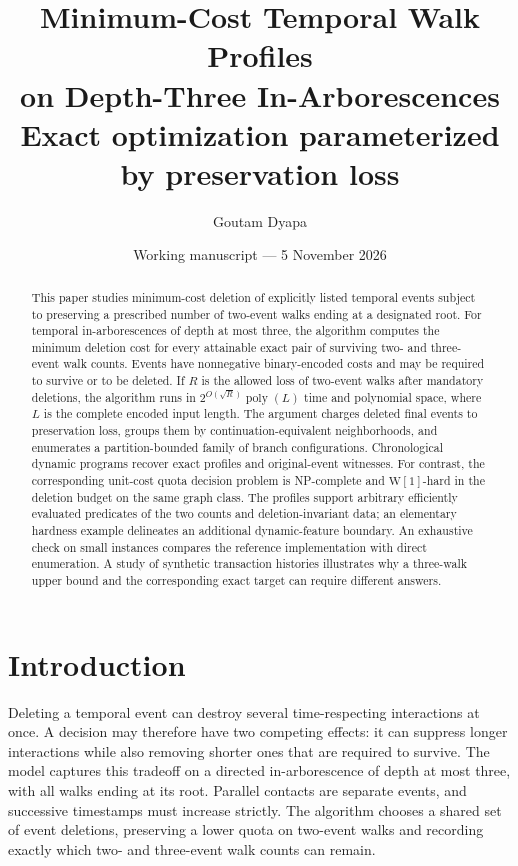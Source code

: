 \documentclass[11pt]{article}
\title{Minimum-Cost Temporal Walk Profiles\\[0.15em]
on Depth-Three In-Arborescences\\[0.4em]
\large Exact optimization parameterized by preservation loss}
\author{Goutam Dyapa}
\date{Working manuscript --- 5 November 2026}
\theoremstyle{remark}
\newcommand{\poly}{\operatorname{poly}}
\begin{document}
\maketitle
\begin{abstract}
This paper studies minimum-cost deletion of explicitly listed temporal events subject to
preserving a prescribed number of two-event walks ending at a designated root.
For temporal in-arborescences of depth at most three, the algorithm computes the minimum
deletion cost for every attainable exact pair of surviving two- and three-event
walk counts. Events have nonnegative binary-encoded costs and may be required
to survive or to be deleted. If $R$ is the allowed loss of two-event walks after
mandatory deletions, the algorithm runs in $2^{O(\sqrt R)}\poly(L)$ time and
polynomial space, where $L$ is the complete encoded input length. The argument
charges deleted final events to preservation loss, groups them by
continuation-equivalent neighborhoods, and enumerates a partition-bounded
family of branch configurations. Chronological dynamic programs recover exact
profiles and original-event witnesses. For contrast, the corresponding
unit-cost quota decision problem is NP-complete and $\mathrm{W}[1]$-hard in
the deletion budget on the same graph class. The profiles support arbitrary
efficiently evaluated predicates of the two counts and deletion-invariant
data; an elementary hardness example delineates an additional dynamic-feature
boundary. An exhaustive check on small instances compares the reference
implementation with direct enumeration. A study of synthetic
transaction histories illustrates why a three-walk upper bound and the
corresponding exact target can require different answers.
\end{abstract}

\section{Introduction}\label{sec:intro}

Deleting a temporal event can destroy several time-respecting interactions
at once. A decision may therefore have two competing effects: it can suppress
longer interactions while also removing shorter ones that are required to
survive. The model captures this tradeoff on a directed in-arborescence of depth at most three, with all walks
ending at its root. Parallel contacts are separate events, and successive
timestamps must increase strictly. The algorithm chooses a shared set of
event deletions, preserving a lower quota on two-event walks and recording
exactly which two- and three-event walk counts can remain.
\end{document}
